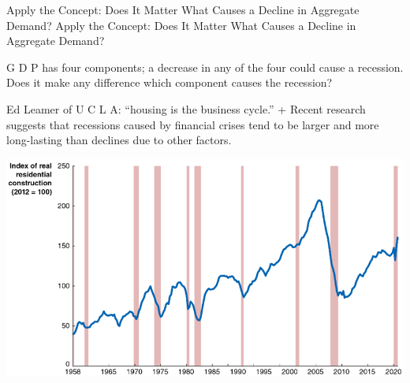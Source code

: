 \documentclass[
  12pt,
  ignorenonframetext,
]{beamer}
\begin{document}
\begin{frame}{Apply the Concept: Does It Matter What Causes a Decline in
Aggregate Demand?}
\protect\hypertarget{apply-the-concept-does-it-matter-what-causes-a-decline-in-aggregate-demand}{}
Apply the Concept: Does It Matter What Causes a Decline in Aggregate
Demand?

G D P has four components; a decrease in any of the four could cause a
recession. Does it make any difference which component causes the
recession?

Ed Leamer of U C L A: ``housing is the business cycle.'' + Recent
research suggests that recessions caused by financial crises tend to be
larger and more long-lasting than declines due to other factors.

\includegraphics[width=\textwidth,height=0.99\textheight]{imgs3/img_slide34a.png}
\end{frame}
\end{document}
